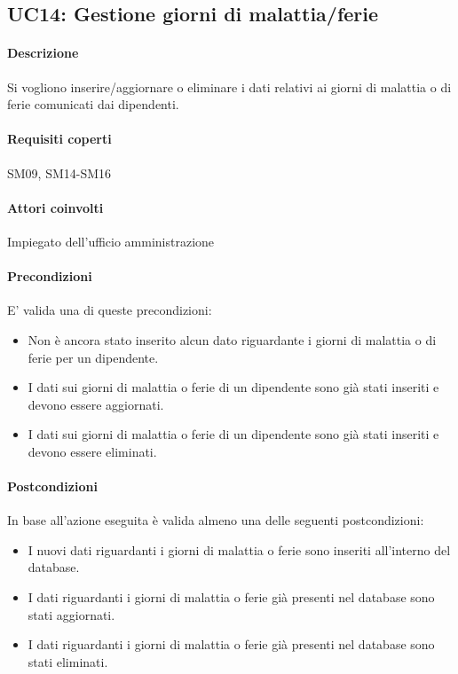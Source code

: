 \subsection{UC14: Gestione giorni di malattia/ferie}
\paragraph{Descrizione}
Si vogliono inserire/aggiornare o eliminare i dati relativi ai giorni di malattia o di ferie comunicati dai dipendenti.
\paragraph{Requisiti coperti}
SM09, SM14-SM16
\paragraph{Attori coinvolti}
Impiegato dell'ufficio amministrazione
\paragraph{Precondizioni}
E' valida una di queste precondizioni:
\begin{itemize}
	\item Non è ancora stato inserito alcun dato riguardante i giorni di malattia o di ferie per un dipendente.
	\item I dati sui giorni di malattia o ferie di un dipendente sono già stati inseriti e devono essere aggiornati.
	\item I dati sui giorni di malattia o ferie di un dipendente sono già stati inseriti e devono essere eliminati.
\end{itemize}
\paragraph{Postcondizioni}
In base all'azione eseguita è valida almeno una delle seguenti postcondizioni:
\begin{itemize}
	\item I nuovi dati riguardanti i giorni di malattia o ferie sono inseriti all'interno del database.
	\item I dati riguardanti i giorni di malattia o ferie già presenti nel database sono stati aggiornati.
	\item I dati riguardanti i giorni di malattia o ferie già presenti nel database sono stati eliminati.
\end{itemize}
